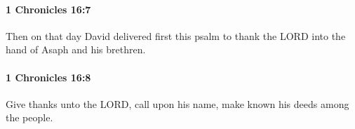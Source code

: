 		\paragraph{1 Chronicles 16:7} %
			\label{1CHRONICLES-16-7}

			Then on that day David delivered first this psalm to thank the LORD into the hand of Asaph and his brethren.


		\paragraph{1 Chronicles 16:8} %
			\label{1CHRONICLES-16-8}

			Give thanks unto the LORD, call upon his name, make known his deeds among the people.


